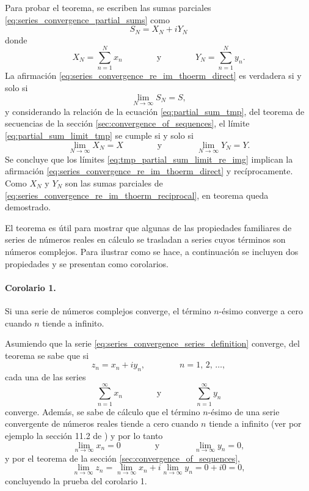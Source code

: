 \documentclass[a4paper]{report}
\begin{document}
Para probar el teorema, se escriben las sumas parciales \ref{eq:series_convergence_partial_sums} como
\begin{equation}\label{eq:partial_sum_tmp}
 S_N=X_N+iY_N 
\end{equation}
donde
\[
 X_N=\sum_{n=1}^Nx_n
 \qquad\qquad\textrm{y}\qquad\qquad
 Y_N=\sum_{n=1}^Ny_n.
\]
La afirmación \ref{eq:series_convergence_re_im_thoerm_direct} es verdadera si y solo si
\begin{equation}\label{eq:partial_sum_limit_tmp}
 \lim_{N\to\infty}S_N=S, 
\end{equation}
y considerando la relación de la ecuación \ref{eq:partial_sum_tmp}, del teorema de secuencias de la sección \ref{sec:convergence_of_sequences}, el límite \ref{eq:partial_sum_limit_tmp} se cumple si y solo si
\begin{equation}\label{eq:tmp_partial_sum_limit_re_img}
 \lim_{N\to\infty}X_N=X
 \qquad\qquad\textrm{y}\qquad\qquad
 \lim_{N\to\infty}Y_N=Y. 
\end{equation}
Se concluye que los límites \ref{eq:tmp_partial_sum_limit_re_img} implican la afirmación \ref{eq:series_convergence_re_im_thoerm_direct} y recíprocamente. Como \(X_N\) y \(Y_N\) son las sumas parciales de \ref{eq:series_convergence_re_im_thoerm_reciprocal}, en teorema queda demostrado.

El teorema es útil para mostrar que algunas de las propiedades familiares de series de números reales en cálculo se trasladan a series cuyos términos son números complejos. Para ilustrar como se hace, a continuación se incluyen dos propiedades y se presentan como corolarios.

\paragraph{Corolario 1.} Si una serie de números complejos converge, el término \(n\)-ésimo converge a cero cuando \(n\) tiende a infinito.

Asumiendo que la serie \ref{eq:series_convergence_series_definition} converge, del teorema se sabe que si
\[
 z_n=x_n+iy_n,
 \qquad\qquad
 n=1,\,2,\,\dots, 
\]
cada una de las series
\[
 \sum_{n=1}^\infty x_n
 \qquad\qquad\textrm{y}\qquad\qquad
 \sum_{n=1}^\infty y_n 
\]
converge. Además, se sabe de cálculo que el término \(n\)-ésimo de una serie convergente de números reales tiende a cero cuando \(n\) tiende a infinito (ver por ejemplo la sección 11.2 de \cite{stewart2016essential}) y por lo tanto
\[
 \lim_{n\to\infty}x_n=0
 \qquad\qquad\textrm{y}\qquad\qquad
 \lim_{n\to\infty}y_n=0,
\]
y por el teorema de la sección \ref{sec:convergence_of_sequences},
\[
 \lim_{n\to\infty}z_n=\lim_{n\to\infty}x_n+i\lim_{n\to\infty}y_n=0+i0=0,
\]
concluyendo la prueba del corolario 1.
\end{document}
